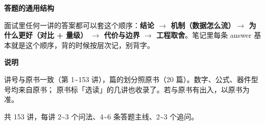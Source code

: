 \documentclass[UTF8,10.5pt,openany]{ctexbook}
\begin{document}
\vspace{4pt}
{\sffamily\bfseries 答题的通用结构}\par\vspace{2pt}
面试里任何一讲的答案都可以套这个顺序：\textbf{结论 $\rightarrow$ 机制（数据怎么流）$\rightarrow$ 为什么更好（对比 + 量级）
$\rightarrow$ 代价与边界 $\rightarrow$ 工程取舍}。笔记里每条 answer 基本就是这个顺序，背的时候按层次记，别背字。

\vspace{4pt}
{\sffamily\bfseries 说明}\par\vspace{2pt}
讲号与原书一致（第 1\textasciitilde 153 讲），篇的划分照原书（20 篇）。数字、公式、器件型号均来自原书；
原书标「选读」的几讲也收录了。若与原书有出入，以原书为准。

\vspace{6pt}
{\footnotesize\color{grayt}共 153 讲，每讲 2\textasciitilde 3 个问法、4\textasciitilde 6 条答题主线、2\textasciitilde 3 个追问。}
\clearpage

\tableofcontents
\clearpage
\end{document}
